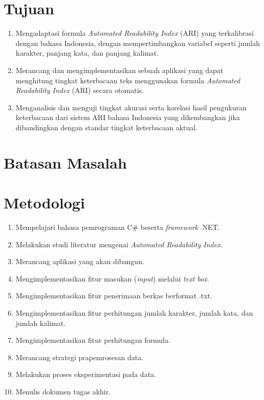 \section{Tujuan}
\label{sec:tujuan}
\begin{enumerate}
    \item Mengadaptasi formula \textit{Automated Readability Index} (ARI) yang terkalibrasi dengan bahasa Indonesia, dengan mempertimbangkan variabel seperti jumlah karakter, panjang kata, dan panjang kalimat.
    \item Merancang dan mengimplementasikan sebuah aplikasi yang dapat menghitung tingkat keterbacaan teks menggunakan formula \textit{Automated Readability Index} (ARI) secara otomatis.
    \item Menganalisis dan menguji tingkat akurasi serta korelasi hasil pengukuran keterbacaan dari sistem ARI bahasa Indonesia yang dikembangkan jika dibandingkan dengan standar tingkat keterbacaan aktual.
\end{enumerate}


\section{Batasan Masalah}
\label{sec:batasan}


\section{Metodologi}
\label{sec:metlit}
\begin{enumerate}
    \item Mempelajari bahasa pemrograman C\# beserta \textit{framework} .NET.
    \item Melakukan studi literatur mengenai \textit{Automated Readability Index}.
    \item Merancang aplikasi yang akan dibangun.
    \item Mengimplementasikan fitur masukan (\textit{input}) melalui \textit{text box}.
    \item Mengimplementasikan fitur penerimaan berkas berformat .txt.
    \item Mengimplementasikan fitur perhitungan jumlah karakter, jumlah kata, dan jumlah kalimat.
    \item Mengimplementasikan fitur perhitungan formula.
    \item Merancang strategi prapemrosesan data.
    \item Melakukan proses eksperimentasi pada data.
    \item Menulis dokumen tugas akhir.
\end{enumerate}


